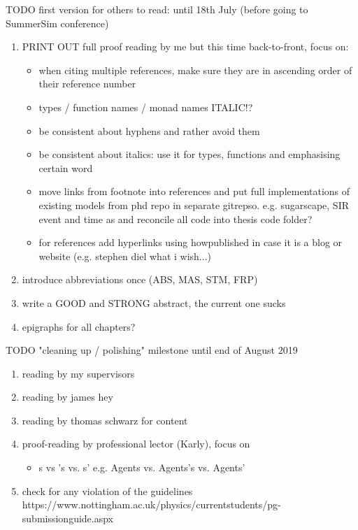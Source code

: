 \documentclass[oneside]{book}
\begin{document}
TODO first version for others to read: until 18th July (before going to SummerSim conference)
\begin{enumerate}
	\item PRINT OUT full proof reading by me but this time back-to-front, focus on:
	\begin{itemize}
		\item when citing multiple references, make sure they are in ascending order of their reference number	
		\item types / function names / monad names ITALIC!?	
		\item be consistent about hyphens and rather avoid them
		\item be consistent about italics: use it for types, functions and emphasising certain word
		\item move links from footnote into references and put full implementations of existing models from phd repo in separate gitrepso. e.g. sugarscape, SIR event and time as and reconcile all code into thesis code folder?
		\item for references add hyperlinks using howpublished in case it is a blog or website (e.g. stephen diel what i wish...)	
	\end{itemize}

	\item introduce abbreviations once (ABS, MAS, STM, FRP)	
	
	\item write a GOOD and STRONG abstract, the current one sucks
	
	\item epigraphs for all chapters?
\end{enumerate}

TODO "cleaning up / polishing" milestone until end of August 2019
\begin{enumerate}
	\item reading by my supervisors

	\item reading by james hey
	
	\item reading by thomas schwarz for content
		
	\item proof-reading by professional lector (Karly), focus on 
	\begin{itemize}
		\item s vs 's vs. s' e.g. Agents vs. Agents's vs. Agents'
	\end{itemize}
	
	\item check for any violation of the guidelines https://www.nottingham.ac.uk/physics/currentstudents/pg-submissionguide.aspx
\end{enumerate}
\end{document}
